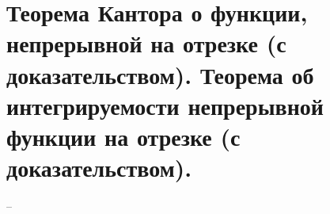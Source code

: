 \section{Теорема Кантора о функции, непрерывной на отрезке (с доказательством). Теорема об интегрируемости непрерывной функции на отрезке (с доказательством).}
--
\newline